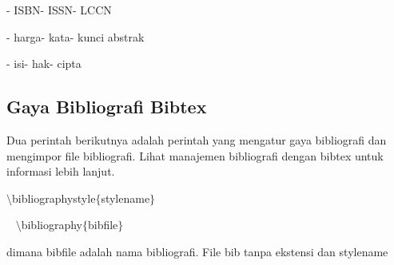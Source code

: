 \begin{itemize}
\begin{itemize}
\hspace*{0.3in}- ISBN\hspace*{0.4in}\hspace*{0.3in}- ISSN\hspace*{0.3in}\hspace*{0.4in}- LCCN\par

\hspace*{0.3in}- harga\hspace*{0.3in}\hspace*{0.4in}- kata\hspace*{0.4in}\hspace*{0.3in}- kunci abstrak\par

\hspace*{0.3in}- isi\hspace*{0.6in}\hspace*{0.3in}- hak\hspace*{0.3in}\hspace*{0.4in}- cipta\par

\vspace{\baselineskip}
\vspace{\baselineskip}
\subsection{Gaya Bibliografi Bibtex}
\vspace{\baselineskip}
Dua perintah berikutnya adalah perintah yang mengatur gaya bibliografi dan mengimpor file bibliografi. Lihat manajemen bibliografi dengan bibtex untuk informasi lebih lanjut. \par
\vspace{\baselineskip}
$\setminus$bibliographystyle$ \{ $stylename$ \} $\par

~ \hspace*{0.5in}$\setminus$bibliography$ \{ $bibfile$ \} $\par
\vspace{\baselineskip}
dimana bibfile adalah nama bibliografi. File bib tanpa ekstensi dan stylename\par
\vspace{\baselineskip}
\vspace{\baselineskip}
\vspace{12pt}

\end{itemize}
\end{itemize}
